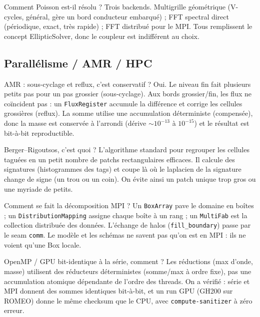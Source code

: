 \documentclass[11pt]{article}
\newcommand{\code}[1]{\texttt{\small #1}}
\begin{document}
\begin{qa}{Comment Poisson est-il résolu ?}
Trois backends. Multigrille géométrique (V-cycles, général, gère un bord conducteur
embarqué) ; FFT spectral direct (périodique, exact, très rapide) ; FFT distribué pour le
MPI. Tous remplissent le concept EllipticSolver, donc le coupleur est indifférent au choix.
\end{qa}

\subsection{Parallélisme / AMR / HPC}

\begin{qa}{AMR : sous-cyclage et reflux, c'est conservatif ?}
Oui. Le niveau fin fait plusieurs petits pas pour un pas grossier (sous-cyclage). Aux
bords grossier/fin, les flux ne coïncident pas : un \code{FluxRegister} accumule la
différence et corrige les cellules grossières (reflux). La somme utilise une accumulation
déterministe (compensée), donc la masse est conservée à l'arrondi (dérive $\sim 10^{-13}$
à $10^{-15}$) et le résultat est bit-à-bit reproductible.
\end{qa}

\begin{qa}{Berger–Rigoutsos, c'est quoi ?}
L'algorithme standard pour regrouper les cellules taguées en un petit nombre de patchs
rectangulaires efficaces. Il calcule des signatures (histogrammes des tags) et coupe là où
le laplacien de la signature change de signe (un trou ou un coin). On évite ainsi un patch
unique trop gros ou une myriade de petits.
\end{qa}

\begin{qa}{Comment se fait la décomposition MPI ?}
Un \code{BoxArray} pave le domaine en boîtes ; un \code{DistributionMapping} assigne
chaque boîte à un rang ; un \code{MultiFab} est la collection distribuée des données.
L'échange de halos (\code{fill\_boundary}) passe par le seam \code{comm}. Le modèle et les
schémas ne savent pas qu'on est en MPI : ils ne voient qu'une Box locale.
\end{qa}

\begin{qa}{OpenMP / GPU bit-identique à la série, comment ?}
Les réductions (max d'onde, masse) utilisent des réducteurs déterministes
(somme/max à ordre fixe), pas une accumulation atomique dépendante de l'ordre des threads.
On a vérifié : série et MPI donnent des sommes identiques bit-à-bit, et un run GPU
(GH200 sur ROMEO) donne le même checksum que le CPU, avec \code{compute-sanitizer} à zéro
erreur.
\end{qa}
\end{document}
